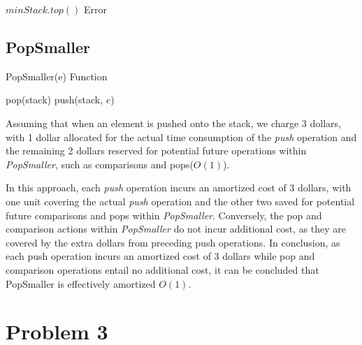 \documentclass[12pt]{article}
\begin{document}
\begin{algorithm*}
    \begin{algorithmic}[1]
            \State \Return $minStack.top()$
        \Else
            \State \Return Error 
        \EndIf
    \EndFunction
    \end{algorithmic}
\end{algorithm*}

     
    
\newpage

\subsection*{PopSmaller}   

\begin{algorithm}
    \caption{PopSmaller(e) Function}
    \begin{algorithmic}[1]
            \State pop(stack)
        \EndWhile
        \State push(stack, $e$)
    \EndFunction
    \end{algorithmic}
\end{algorithm}

\textit{}
Assuming that when an element is pushed onto the stack, 
we charge 3 dollars, with 1 dollar allocated for the actual 
time consumption of the \textit{push} operation and the 
remaining 2 dollars reserved for potential future operations 
within \textit{PopSmaller}, such as comparisons and pops($O(1)$).

In this approach, each \textit{push} operation incurs
an amortized cost of 3 dollars, with one unit covering the actual 
\textit{push} operation and the other two saved for potential 
future comparisons and pops within \textit{PopSmaller}. 
Conversely, the pop and comparison actions within \textit{PopSmaller}
do not incur additional cost, as they are covered by the extra dollars
from preceding push operations.
In conclusion, as each push operation incurs an amortized cost of 
3 dollars while pop and comparison operations entail no additional cost, 
it can be concluded that PopSmaller is effectively amortized $O(1)$.






\newpage

\section*{Problem 3}
\end{document}
